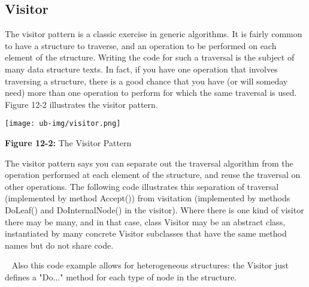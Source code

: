 \subsection*{Visitor}

The visitor pattern is a classic exercise in
generic algorithms. It is fairly common to have a structure to
traverse, and an operation to be performed on each
element of the structure. Writing the code for such a traversal is the
subject of many data structure texts. In fact, if you have one
operation that involves traversing a structure, there is a good chance
that you have (or will someday need) more than one operation to perform
for which the same traversal is used. Figure 12-2 illustrates the
visitor pattern.

\bigskip

\texttt{[image: ub-img/visitor.png]}

{\sffamily\bfseries Figure 12-2:}
{\sffamily The Visitor Pattern}

\bigskip

The visitor pattern says you can separate out the traversal algorithm
from the operation performed at each element of the structure, and
reuse the traversal on other operations. The following code illustrates
this separation of traversal (implemented by method \textsf{Accept()})
from visitation (implemented by methods \textsf{DoLeaf()} and
\textsf{DoInternalNode()} in the visitor). Where there is one kind of
visitor there may be many, and in that case, class Visitor may be an
abstract class, instantiated by many concrete Visitor
subclasses that have the same method names but do not
share code.

\medskip{}\ {\sffamily
Also this code example allows for heterogeneous
structures: the Visitor just defines a
"Do..." method for each type of node in the
structure.}\medskip


